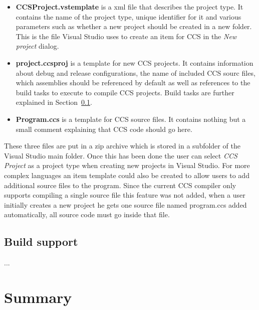	\begin{itemize}
		\item \textbf{CCSProject.vstemplate} is a xml file that describes the 
		project type. It contains the name of the project type, unique identifier 
		for it and various parameters such as whether a new project should be 
		created in a new folder. This is the file Visual Studio uses to create an 
		item for CCS in the \textit{New project} dialog.
		
		\item \textbf{project.ccsproj} is a template for new CCS projects. It 
		contains information about debug and release configurations, the name of 
		included CCS sourc files, which assemblies should be referenced by default 
		as well as references to the build tasks to execute to compile CCS 
		projects. Build tasks are further explained in Section~\ref{msbuild}.
		
		\item \textbf{Program.ccs} is a template for CCS source files. It contains
		nothing but a small comment explaining that CCS code should go here. 
	
	\end{itemize}
	
	These three files are put in a zip archive which is stored in a subfolder of
	the Visual Studio main folder. Once this has been done the user can select 
	\textit{CCS Project} as a project type when creating new projects in Visual 
	Studio. For more complex languages an item template could also be created to
	allow users to add additional source files to the program. Since the current
	CCS compiler only supports compiling a single source file this feature was 
	not added, when a user initially creates a new project he gets one source 
	file named \textsf{program.ccs} added automatically, all source code must go
	inside that file.

	\subsection{Build support}\label{msbuild}
	
	...
	
	\section{Summary}
	
